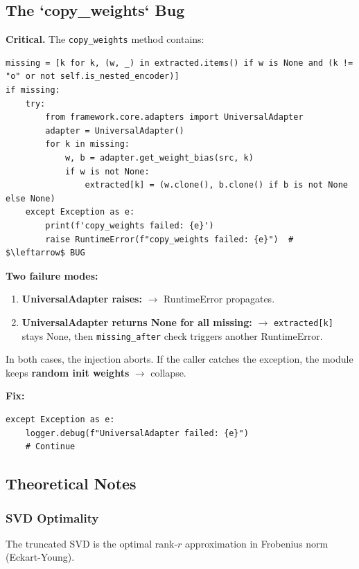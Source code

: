 \subsection{The `copy\_weights` Bug}

\textbf{Critical.} The \texttt{copy\_weights} method contains:

\begin{lstlisting}
missing = [k for k, (w, _) in extracted.items() if w is None and (k != "o" or not self.is_nested_encoder)]
if missing:
    try:
        from framework.core.adapters import UniversalAdapter
        adapter = UniversalAdapter()
        for k in missing:
            w, b = adapter.get_weight_bias(src, k)
            if w is not None:
                extracted[k] = (w.clone(), b.clone() if b is not None else None)
    except Exception as e:
        print(f'copy_weights failed: {e}')
        raise RuntimeError(f"copy_weights failed: {e}")  # $\leftarrow$ BUG
\end{lstlisting}

\textbf{Two failure modes:}

\begin{enumerate}
\item \textbf{UniversalAdapter raises:} $\to$ RuntimeError propagates.
\item \textbf{UniversalAdapter returns None for all missing:} $\to$ \texttt{extracted[k]} stays None, then \texttt{missing\_after} check triggers another RuntimeError.

\end{enumerate}
In both cases, the injection aborts. If the caller catches the exception, 
the module keeps \textbf{random init weights} $\to$ collapse.

\textbf{Fix:}

\begin{lstlisting}
except Exception as e:
    logger.debug(f"UniversalAdapter failed: {e}")
    # Continue
\end{lstlisting}

\subsection{Theoretical Notes}

\subsubsection{SVD Optimality}

The truncated SVD is the optimal rank-$r$ approximation in Frobenius norm 
(Eckart-Young).

